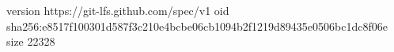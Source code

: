 version https://git-lfs.github.com/spec/v1
oid sha256:e8517f100301d587f3c210e4bcbe06cb1094b2f1219d89435e0506bc1dc8f06e
size 22328
